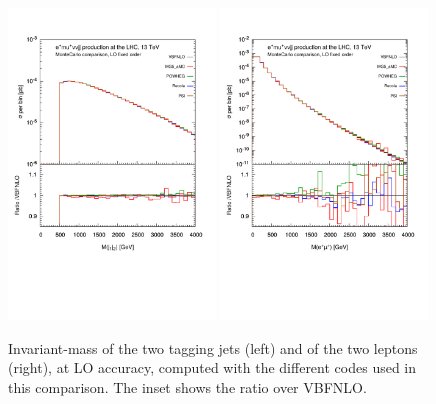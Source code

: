  \begin{figure}[h!]
   \centering
   \includegraphics[width=0.49\textwidth,angle=0,clip=true,trim={0.4cm 2.5cm 0.cm 1.cm}]{figures/mjj_LO.pdf}
   \includegraphics[width=0.49\textwidth,angle=0,clip=true,trim={0.4cm 2.5cm 0.cm 1.cm}]{figures/mll_LO.pdf}
\caption{\label{fig:wg1_mjj-llLO} Invariant-mass of the two tagging jets (left) and of the two leptons (right), at LO accuracy, 
computed with the different codes used in this comparison. The inset shows the ratio over {\sc VBFNLO}.
}
\end{figure}

